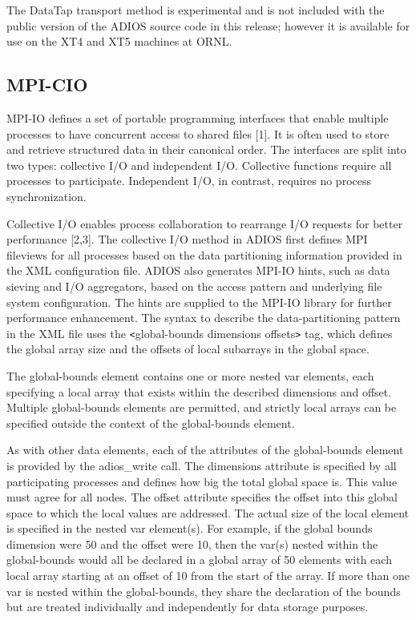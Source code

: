 The DataTap transport method is experimental and is not included with the public 
version of the ADIOS source code in this release; however it is available for use 
on the XT4 and XT5 machines at ORNL.



\subsection{MPI-CIO}

MPI-IO defines a set of portable programming interfaces that enable multiple processes 
to have concurrent access to shared files [1]. It is often used to store and retrieve 
structured data in their canonical order. The interfaces are split into two types: 
collective I/O and independent I/O. Collective functions require all processes 
to participate. Independent I/O, in contrast, requires no process synchronization.

Collective I/O enables process collaboration to rearrange I/O requests for better 
performance [2,3]. The collective I/O method in ADIOS first defines MPI fileviews 
for all processes based on the data partitioning information provided in the XML 
configuration file. ADIOS also generates MPI-IO hints, such as data sieving and 
I/O aggregators, based on the access pattern and underlying file system configuration. 
The hints are supplied to the MPI-IO library for further performance enhancement. 
The syntax to describe the data-partitioning pattern in the XML file uses the \texttt{<}global-bounds 
dimensions offsets\texttt{>} tag, which defines the global array size and the offsets 
of local subarrays in the global space. 

The global-bounds element contains one or more nested var elements, each specifying 
a local array that exists within the described dimensions and offset.  Multiple 
global-bounds elements are permitted, and strictly local arrays can be specified 
outside the context of the global-bounds element.

As with other data elements, each of the attributes of the global-bounds element 
is provided by the adios\_write call. The dimensions attribute is specified by 
all participating processes and defines how big the total global space is.  This 
value must agree for all nodes. The offset attribute specifies the offset into 
this global space to which the local values are addressed. The actual size of the 
local element is specified in the nested var element(s).  For example, if the global 
bounds dimension were 50 and the offset were 10, then the var(s) nested within 
the global-bounds would all be declared in a global array of 50 elements with each 
local array starting at an offset of 10 from the start of the array.  If more than 
one var is nested within the global-bounds, they share the declaration of the bounds 
but are treated individually and independently for data storage purposes. 


